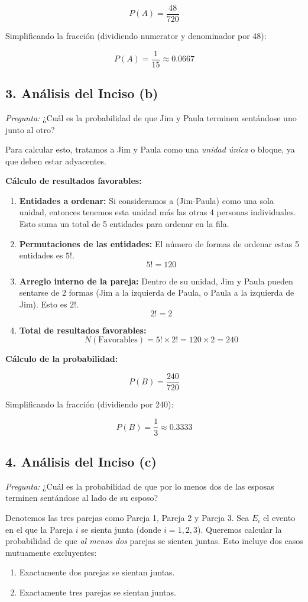 \documentclass[a4paper]{article}
\begin{document}
$$ P(A) = \frac{48}{720} $$

Simplificando la fracción (dividiendo numerator y denominador por 48):

$$ P(A) = \frac{1}{15} \approx 0.0667 $$

\subsection*{3. Análisis del Inciso (b)}

\textit{Pregunta:} ¿Cuál es la probabilidad de que Jim y Paula terminen sentándose uno junto al otro?

Para calcular esto, tratamos a Jim y Paula como una \textit{unidad única} o bloque, ya que deben estar adyacentes.

\textbf{Cálculo de resultados favorables:}
\begin{enumerate}
    \item \textbf{Entidades a ordenar:} Si consideramos a (Jim-Paula) como una sola unidad, entonces tenemos esta unidad más las otras 4 personas individuales. Esto suma un total de 5 entidades para ordenar en la fila.
    \item \textbf{Permutaciones de las entidades:} El número de formas de ordenar estas 5 entidades es $5!$.
    $$ 5! = 120 $$
    \item \textbf{Arreglo interno de la pareja:} Dentro de su unidad, Jim y Paula pueden sentarse de 2 formas (Jim a la izquierda de Paula, o Paula a la izquierda de Jim). Esto es $2!$.
    $$ 2! = 2 $$
    \item \textbf{Total de resultados favorables:}
    $$ N(\text{Favorables}) = 5! \times 2! = 120 \times 2 = 240 $$
\end{enumerate}

\textbf{Cálculo de la probabilidad:}

$$ P(B) = \frac{240}{720} $$

Simplificando la fracción (dividiendo por 240):

$$ P(B) = \frac{1}{3} \approx 0.3333 $$

\subsection*{4. Análisis del Inciso (c)}

\textit{Pregunta:} ¿Cuál es la probabilidad de que por lo menos dos de las esposas terminen sentándose al lado de su esposo?

Denotemos las tres parejas como Pareja 1, Pareja 2 y Pareja 3.
Sea $E_i$ el evento en el que la Pareja $i$ se sienta junta (donde $i = 1, 2, 3$).
Queremos calcular la probabilidad de que \textit{al menos dos} parejas se sienten juntas. Esto incluye dos casos mutuamente excluyentes:
\begin{enumerate}
    \item Exactamente dos parejas se sientan juntas.
    \item Exactamente tres parejas se sientan juntas.
\end{enumerate}
\end{document}
